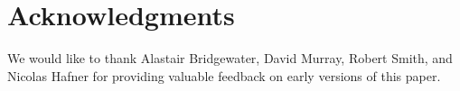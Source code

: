 \section{Acknowledgments} 

We would like to thank Alastair Bridgewater, David Murray, Robert
Smith, and Nicolas Hafner for providing valuable feedback on early
versions of this paper.
